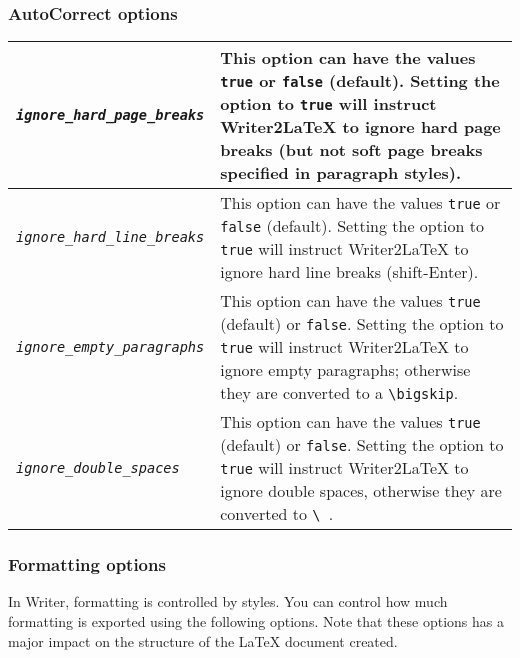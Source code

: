 \documentclass{article}
\newcommand\textstyleSourceText[1]{\texttt{\textmd{#1}}}
\begin{document}
\subsubsection[AutoCorrect options]{AutoCorrect options}
\begin{center}
\begin{tabular}{|l|l|}

\hline
\mdseries \textstyleSourceText{\emph{ignore\_hard\_page\_breaks}} & \mdseries This option can have the values \textstyleSourceText{true} or \textstyleSourceText{false} (default).  Setting the option to \textstyleSourceText{true} will instruct Writer2LaTeX to ignore hard page breaks (but not soft page breaks specified in paragraph styles).\\\hline
\mdseries \textstyleSourceText{\emph{ignore\_hard\_line\_breaks}} & \mdseries This option can have the values \textstyleSourceText{true} or \textstyleSourceText{false} (default). Setting the option to \textstyleSourceText{true} will instruct Writer2LaTeX to ignore hard line breaks (shift-Enter).\\\hline
\mdseries \textstyleSourceText{\emph{ignore\_empty\_paragraphs}} & \mdseries This option can have the values \textstyleSourceText{true} (default) or \textstyleSourceText{false}. Setting the option to \textstyleSourceText{true} will instruct Writer2LaTeX to ignore empty paragraphs; otherwise they are converted to a \textstyleSourceText{{\textbackslash}bigskip}.\\\hline
\mdseries \textstyleSourceText{\emph{ignore\_double\_spaces}} & \mdseries This option can have the values \textstyleSourceText{true} (default) or \textstyleSourceText{false}. Setting the option to \textstyleSourceText{true} will instruct Writer2LaTeX to ignore double spaces, otherwise they are converted to \textstyleSourceText{{\textbackslash}~}.\\\hline
\end{tabular}
\end{center}
\subsubsection*{Formatting options}
{\mdseries
In Writer, formatting is controlled by styles. You can control how much formatting is exported using the following options. Note that these options has a major impact on the structure of the LaTeX document created.}
\end{document}
